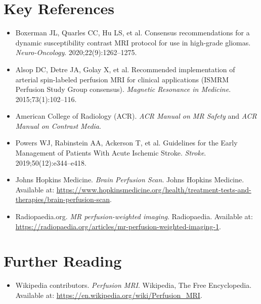 \section{Key References}

\begin{itemize}
    \item Boxerman JL, Quarles CC, Hu LS, et al. Consensus recommendations for a dynamic susceptibility contrast MRI protocol for use in high-grade gliomas. \textit{Neuro-Oncology}. 2020;22(9):1262--1275.
    \item Alsop DC, Detre JA, Golay X, et al. Recommended implementation of arterial spin-labeled perfusion MRI for clinical applications (ISMRM Perfusion Study Group consensus). \textit{Magnetic Resonance in Medicine}. 2015;73(1):102--116.
    \item American College of Radiology (ACR). \textit{ACR Manual on MR Safety} and \textit{ACR Manual on Contrast Media}.
    \item Powers WJ, Rabinstein AA, Ackerson T, et al. Guidelines for the Early Management of Patients With Acute Ischemic Stroke. \textit{Stroke}. 2019;50(12):e344--e418.
    \item Johns Hopkins Medicine. \textit{Brain Perfusion Scan}. Johns Hopkins Medicine. Available at: \url{https://www.hopkinsmedicine.org/health/treatment-tests-and-therapies/brain-perfusion-scan}.
    \item Radiopaedia.org. \textit{MR perfusion-weighted imaging}. Radiopaedia. Available at: \url{https://radiopaedia.org/articles/mr-perfusion-weighted-imaging-1}.
\end{itemize}

\section{Further Reading}
\begin{itemize}
  \item Wikipedia contributors. \textit{Perfusion MRI}. Wikipedia, The Free Encyclopedia. Available at: \url{https://en.wikipedia.org/wiki/Perfusion_MRI}.
\end{itemize}
